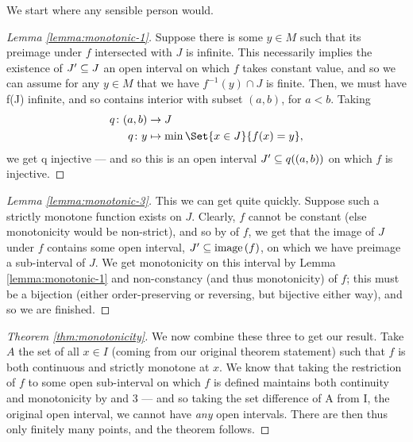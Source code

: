 We start where any sensible person would.

\begin{proof}[Lemma \ref{lemma:monotonic-1}]
  Suppose there is some $y \in M$ such that its preimage under $f$ intersected with $J$ is infinite. This necessarily implies the existence of $ J^{\prime} \subseteq J$ an open interval on which $f$ takes constant value, and so we can assume for any $y \in M$ that we have $f^{-1}(y) \cap J$ is finite. Then, we must have f(J) infinite, and so contains interior with subset $ (a, b) $, for $a < b$. Taking
  \begin{align*}
    q \colon (a, b) &\to J \\
    q \colon y &\mapsto \min{\Set{x \in J}{f(x) = y}},
  \end{align*}
  we get q injective — and so this is an open interval $ J^{\prime} \subseteq q((a, b))$ on which $f$ is injective.
\end{proof}


\begin{proof}[Lemma \ref{lemma:monotonic-3}]
  This we can get quite quickly. Suppose such a strictly monotone function exists on $J$. Clearly, $f$ cannot be constant (else monotonicity would be non-strict), and so by \omy of $f$, we get that the image of $J$ under $f$ contains some open interval, $ J^{\prime} \subseteq \operatorname{image}\left(f\right)$, on which we have preimage a sub-interval of $J$. We get monotonicity on this interval by Lemma \ref{lemma:monotonic-1} and non-constancy (and thus monotonicity) of $f$; this must be a bijection (either order-preserving or reversing, but bijective either way), and so we are finished.
\end{proof}


\begin{proof}[Theorem \ref{thm:monotonicity}]
  We now combine these three \lemmas to get our result. Take $A$ the set of all $x \in I$ (coming from our original theorem statement) such that $f$ is both continuous and strictly monotone at $x$. We know that taking the restriction of $f$ to some open sub-interval on which $f$ is defined maintains both continuity and monotonicity by  and 3 — and so taking the set difference of A from I, the original open interval, we cannot have \emph{any} open intervals. There are then thus only finitely many points, and the theorem follows.
\end{proof}

